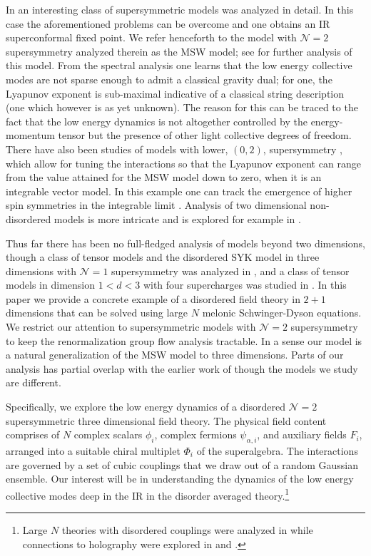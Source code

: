 \documentclass[11pt]{article}
\begin{document}
In \cite{Murugan:2017eto} an interesting class of supersymmetric models was analyzed in detail. In this case the aforementioned problems can be overcome and  one obtains an IR superconformal fixed point. We refer henceforth to the model with $\mathcal{N}=2$ supersymmetry analyzed therein as the MSW model; see \cite{Bulycheva:2018qcp} for further analysis of this model. From the spectral analysis one learns that the low energy collective modes are not sparse enough to admit a classical gravity dual; for one, the Lyapunov exponent is sub-maximal indicative of a classical string description (one which however is as yet unknown). The reason for this can be traced to the fact that the low energy dynamics is not altogether controlled by the energy-momentum tensor but the presence of other  light collective degrees of freedom. There have also been studies of models with lower, $(0,2)$, supersymmetry \cite{Peng:2018zap}, which allow for tuning the interactions so that the Lyapunov exponent can range from the value attained for the MSW model down to zero, when it is an integrable vector model.  In this example one can track the emergence of higher spin symmetries in the integrable limit \cite{Ahn:2018sgn}. Analysis of two dimensional non-disordered models is more intricate and is explored for example in \cite{Chang:2019yug}. 

Thus far there has been no full-fledged analysis of models beyond two dimensions, though a class of tensor models and the disordered SYK model in three dimensions with $\mathcal{N}=1$ supersymmetry was analyzed in \cite{Popov:2019nja},  and a class of tensor models in dimension $1<d<3$ with four supercharges was studied in \cite{Lettera:2020uay}. In this paper we provide a concrete example of a disordered field theory in $2+1$ dimensions that can be solved using large $N$ melonic Schwinger-Dyson equations.  We restrict our attention to supersymmetric models with $\mathcal{N}=2$ supersymmetry to keep the renormalization group flow analysis tractable. In a sense our model is a natural generalization of the MSW model to three dimensions. Parts of our analysis has partial overlap with the earlier work of \cite{Popov:2019nja} though the models we study are different.

Specifically, we explore the low energy dynamics of a disordered $\mathcal{N}=2$ supersymmetric three dimensional field theory. The physical field content comprises of $N$ complex scalars $\phi_i$, complex fermions $\psi_{\alpha,i}$, and auxiliary fields $F_i$, arranged into a suitable chiral multiplet $\Phi_i$ of the superalgebra.  The interactions are governed by a set of cubic couplings that we draw out of a random Gaussian ensemble. Our interest will be in understanding the dynamics of the low energy collective modes deep in the IR in the disorder averaged theory.\footnote{Large $N$ theories with disordered couplings were analyzed in \cite{Aharony:2015aea} while connections to holography were explored in \cite{Adams:2011rj}  and \cite{Hartnoll:2014cua,Hartnoll:2015faa}.}
\end{document}

